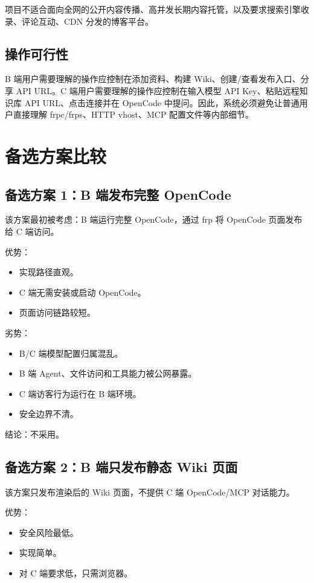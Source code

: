 \documentclass[UTF8,a4paper,12pt,fontset=fandol]{ctexart}
\begin{document}
项目不适合面向全网的公开内容传播、高并发长期内容托管，以及要求搜索引擎收录、评论互动、CDN 分发的博客平台。

\subsection{操作可行性}
B 端用户需要理解的操作应控制在添加资料、构建 Wiki、创建/查看发布入口、分享 API URL。C 端用户需要理解的操作应控制在输入模型 API Key、粘贴远程知识库 API URL、点击连接并在 OpenCode 中提问。因此，系统必须避免让普通用户直接理解 frpc/frps、HTTP vhost、MCP 配置文件等内部细节。

\section{备选方案比较}

\subsection{备选方案 1：B 端发布完整 OpenCode}
该方案最初被考虑：B 端运行完整 OpenCode，通过 frp 将 OpenCode 页面发布给 C 端访问。

优势：
\begin{itemize}
  \item 实现路径直观。
  \item C 端无需安装或启动 OpenCode。
  \item 页面访问链路较短。
\end{itemize}

劣势：
\begin{itemize}
  \item B/C 端模型配置归属混乱。
  \item B 端 Agent、文件访问和工具能力被公网暴露。
  \item C 端访客行为运行在 B 端环境。
  \item 安全边界不清。
\end{itemize}

结论：不采用。

\subsection{备选方案 2：B 端只发布静态 Wiki 页面}
该方案只发布渲染后的 Wiki 页面，不提供 C 端 OpenCode/MCP 对话能力。

优势：
\begin{itemize}
  \item 安全风险最低。
  \item 实现简单。
  \item 对 C 端要求低，只需浏览器。
\end{itemize}
\end{document}
